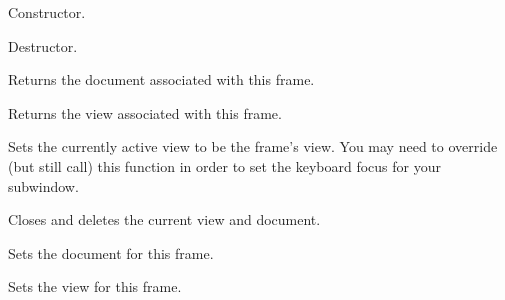 Constructor.

\label{wxdocmdichildframedtor}


Destructor.

\label{wxdocmdichildframegetdocument}


Returns the document associated with this frame.

\label{wxdocmdichildframegetview}


Returns the view associated with this frame.

\label{wxdocmdichildframeonactivate}


Sets the currently active view to be the frame's view. You may need
to override (but still call) this function in order to set the keyboard
focus for your subwindow.

\label{wxdocmdichildframeonclosewindow}


Closes and deletes the current view and document.

\label{wxdocmdichildframesetdocument}


Sets the document for this frame.

\label{wxdocmdichildframesetview}


Sets the view for this frame.


